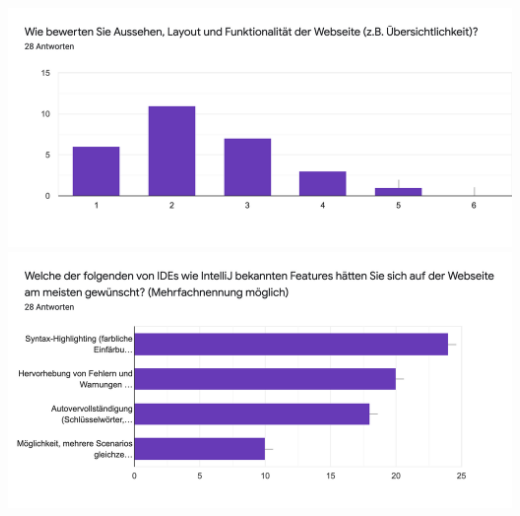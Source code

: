 \includegraphics[width=\textwidth]{images/website.png}
\includegraphics[width=\textwidth]{images/editor-features.png}

